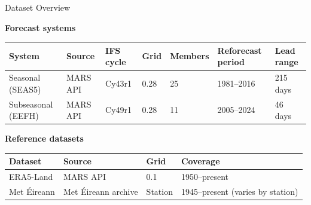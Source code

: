 \documentclass[aspectratio=169]{beamer}
\begin{document}
\begin{frame}{Dataset Overview}

    \centering
    \vspace{-0.3em}

    {\footnotesize\textbf{Forecast systems}}
    \vspace{0.3em}

    \footnotesize
    \renewcommand{\arraystretch}{1.3}
    \begin{tabular}{l l l l l l l}
    \toprule
    \textbf{System} & \textbf{Source} & \textbf{IFS cycle} & \textbf{Grid} & \textbf{Members} & \textbf{Reforecast period} & \textbf{Lead range} \\
    \midrule
    Seasonal (SEAS5)       & MARS API & Cy43r1 & 0.28\textdegree{} & 25 & 1981--2016 & 215 days \\
    Subseasonal (EEFH)     & MARS API & Cy49r1 & 0.28\textdegree{} & 11 & 2005--2024 & 46 days  \\
    \bottomrule
    \end{tabular}

    \vspace{0.8em}

    {\footnotesize\textbf{Reference datasets}}
    \vspace{0.3em}

    \footnotesize
    \renewcommand{\arraystretch}{1.3}
    \begin{tabular}{l l l l}
    \toprule
    \textbf{Dataset} & \textbf{Source} & \textbf{Grid} & \textbf{Coverage} \\
    \midrule
    ERA5-Land     & MARS API              & 0.1\textdegree{} & 1950--present \\
    Met \'Eireann & Met \'Eireann archive & Station          & 1945--present (varies by station) \\
    \bottomrule
    \end{tabular}

    \vspace{0.8em}
    \scriptsize

\end{frame}
\end{document}
